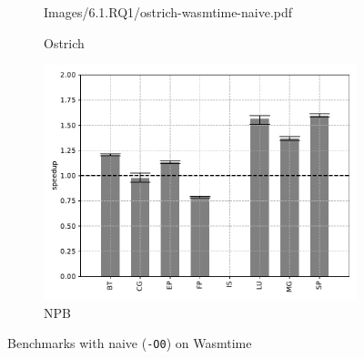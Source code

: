 \begin{figure}
\begin{subfigure}[t]{.45\textwidth}
        {Images/6.1.RQ1/ostrich-wasmtime-naive.pdf}
        \caption{Ostrich}
    \end{subfigure}
    \begin{subfigure}[t]{.45\textwidth}
        \includegraphics[width=\textwidth]
        {Images/6.1.RQ1/npb-wasmtime-naive.pdf}
        \caption{NPB}
    \end{subfigure}
    \caption{Benchmarks with naive (\texttt{-O0}) on Wasmtime}
    \label{fig:rq1-wasmtime-naive}
\end{figure}

